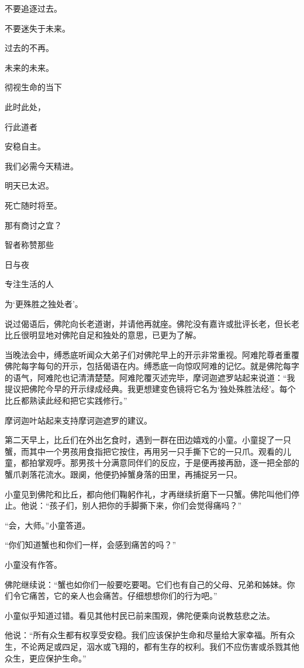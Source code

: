 \documentclass[12pt,twoside,openany]{book}
\begin{document}
不要追逐过去。

不要迷失于未来。

过去的不再。

未来的未来。

彻视生命的当下

此时此处，

行此道者

安稳自主。

我们必需今天精进。

明天已太迟。

死亡随时将至。

那有商讨之宜？

智者称赞那些

日与夜

专注生活的人

为‘更殊胜之独处者’。

说过偈语后，佛陀向长老道谢，并请他再就座。佛陀没有嘉许或批评长老，但长老比丘很明显地对佛陀自足和独处的意思，已更为了解。

当晚法会中，缚悉底听闻众大弟子们对佛陀早上的开示非常重视。阿难陀尊者重覆佛陀每字每句的开示，包括偈语在内。缚悉底一向惊叹阿难的记忆。就是佛陀每字的语气，阿难陀也记清清楚楚。阿难陀覆灭述完毕，摩诃迦遮罗站起来说道：“我提议把佛陀今早的开示绿成经典。我更想建变色镜将它名为‘独处殊胜法经’。每个比丘都熟读此经和把它实践修行。”

摩诃迦叶站起来支持摩诃迦遮罗的建议。

第二天早上，比丘们在外出乞食时，遇到一群在田边嬉戏的小童。小童捉了一只蟹，而其中一个男孩用食指把它按住，再用另一只手撕下它的一只爪。观看的儿童，都拍掌观呼。那男孩十分满意同伴们的反应，于是便再接再励，逐一把全部的蟹爪剥落花流水。跟阒，他便扔掉蟹身落的田里，再捕捉另一只。

小童见到佛陀和比丘，都向他们鞠躬作礼，才再继续折磨下一只蟹。佛陀叫他们停止。他说：“孩子们，别人把你的手脚撕下来，你们会觉得痛吗？”

“会，大师。”小童答道。

“你们知道蟹也和你们一样，会感到痛苦的吗？”

小童没有作答。

佛陀继续说：“蟹也如你们一般要吃要喝。它们也有自己的父母、兄弟和姊妹。你们令它痛苦，它的亲人也会痛苦。仔细想想你们的行为吧。”

小童似乎知道过错。看见其他村民已前来围观，佛陀便乘向说教慈悲之法。

他说：“所有众生都有权享受安稳。我们应该保护生命和尽量给大家幸福。所有众生，不论两足或四足，泅水或飞翔的，都有生存的权利。我们不应伤害或杀戮其他众生，更应保护生命。”
\end{document}
